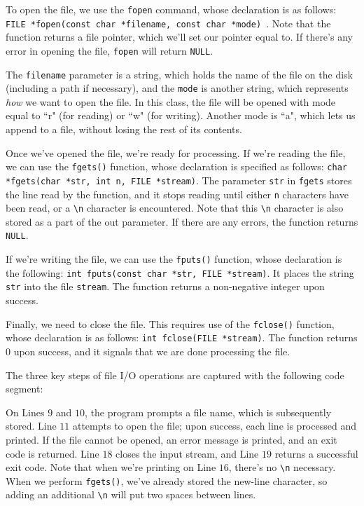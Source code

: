 To open the file, we use the \verb!fopen! command, whose declaration is as follows: \texttt{FILE *fopen(const char *filename, const char *mode)
}. Note that the function returns a file pointer, which we'll set our pointer equal to. If there's any error in opening the file, \verb!fopen! will return \verb!NULL!. 

The \verb!filename! parameter is a string, which holds the name of the file on the disk (including a path if necessary), and the \verb!mode! is another string, which represents \textit{how} we want to open the file. In this class, the file will be opened with mode equal to ``r" (for reading) or ``w" (for writing). Another mode is ``a", which lets us append to a file, without losing the rest of its contents.  


Once we've opened the file, we're ready for processing. If we're reading the file, we can use the \texttt{fgets()} function, whose declaration is specified as follows: \texttt{char *fgets(char *str, int n, FILE *stream)}. The parameter \verb!str! in \verb!fgets! stores the line read by the function, and it stops reading until either \verb!n! characters have been read, or a \verb!\n! character is encountered. Note that this \verb!\n! character is also stored as a part of the out parameter. If there are any errors, the function returns \verb!NULL!. 

If we're writing the file, we can use the \verb!fputs()! function, whose declaration is the following: \texttt{int fputs(const char *str, FILE *stream)}. It places the string \verb!str! into the file \verb!stream!. The function returns a non-negative integer upon success.


Finally, we need to close the file. This requires use of the  \verb!fclose()! function, whose declaration is as follows: \texttt{int fclose(FILE *stream)}. The function returns $0$ upon success, and it signals that we are done processing the file.


The three key steps of file I/O operations are captured with the following code segment:

\begin{center}

\end{center}

On Lines $9$ and $10$, the program prompts a file name, which is subsequently stored. Line $11$ attempts to open the file; upon success, each line is processed and printed. If the file cannot be opened, an error message is printed, and an exit code is returned. Line $18$ closes the input stream, and Line $19$ returns a successful exit code. Note that when we're printing on Line $16$, there's no \verb!\n! necessary. When we perform \verb!fgets()!, we've already stored the new-line character, so adding an additional \verb!\n! will put two spaces between lines. \\

